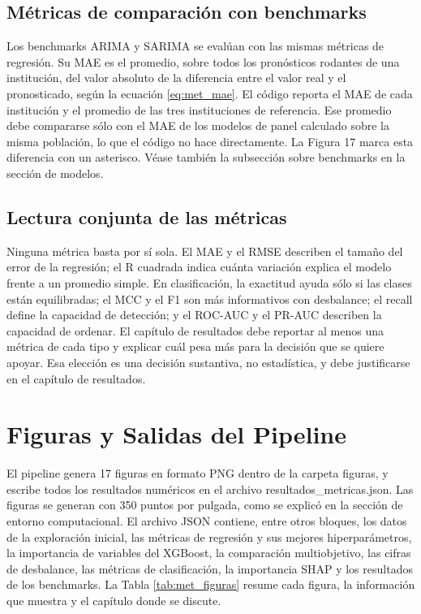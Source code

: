 \subsection{Métricas de comparación con benchmarks}
Los benchmarks ARIMA y SARIMA se evalúan con las mismas métricas de regresión. Su MAE es el promedio, sobre todos los pronósticos rodantes de una institución, del valor absoluto de la diferencia entre el valor real y el pronosticado, según la ecuación \eqref{eq:met_mae}. El código reporta el MAE de cada institución y el promedio de las tres instituciones de referencia. Ese promedio debe compararse sólo con el MAE de los modelos de panel calculado sobre la misma población, lo que el código no hace directamente. La Figura 17 marca esta diferencia con un asterisco. Véase también la subsección sobre benchmarks en la sección de modelos.

\subsection{Lectura conjunta de las métricas}
Ninguna métrica basta por sí sola. El MAE y el RMSE describen el tamaño del error de la regresión; el R cuadrada indica cuánta variación explica el modelo frente a un promedio simple. En clasificación, la exactitud ayuda sólo si las clases están equilibradas; el MCC y el F1 son más informativos con desbalance; el recall define la capacidad de detección; y el ROC-AUC y el PR-AUC describen la capacidad de ordenar. El capítulo de resultados debe reportar al menos una métrica de cada tipo y explicar cuál pesa más para la decisión que se quiere apoyar. Esa elección es una decisión sustantiva, no estadística, y debe justificarse en el capítulo de resultados.

\section{Figuras y Salidas del Pipeline}

El pipeline genera 17 figuras en formato PNG dentro de la carpeta figuras, y escribe todos los resultados numéricos en el archivo resultados\_metricas.json. Las figuras se generan con 350 puntos por pulgada, como se explicó en la sección de entorno computacional. El archivo JSON contiene, entre otros bloques, los datos de la exploración inicial, las métricas de regresión y sus mejores hiperparámetros, la importancia de variables del XGBoost, la comparación multiobjetivo, las cifras de desbalance, las métricas de clasificación, la importancia SHAP y los resultados de los benchmarks. La Tabla \ref{tab:met_figuras} resume cada figura, la información que muestra y el capítulo donde se discute.


